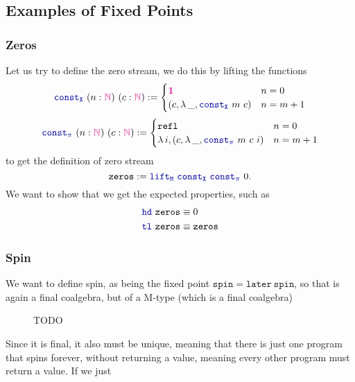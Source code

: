 \documentclass[twoside,11pt,openright]{report}
\newcommand*{\type}[1]{\textcolor{magenta!90!black}{#1}}
\newcommand*{\unit}{\type{\textbf{1}}}
\newcommand*{\function}[1]{\textcolor{blue!60!black}{\ensuremath{\mathtt{#1}}}}
\begin{document}
\subsection{Examples of Fixed Points}
\subsubsection{Zeros}
Let us try to define the zero stream, we do this by lifting the functions
\begin{equation}
  \function{const_X}~(n : \type{\mathbb{N}})~(c : \type{\mathbb{N}})  := \begin{cases} \unit & n = 0 \\ (c , \lambda\,\_, \function{const_X}~m~c) & n = m + 1 \end{cases}
\end{equation}
\begin{equation}
  \function{const_\pi}~(n : \type{\mathbb{N}})~(c : \type{\mathbb{N}}) := \begin{cases} \mathtt{refl} & n = 0 \\ \lambda\,i,(c , \lambda\,\_, \function{const_\pi}~m~c~i) & n = m + 1 \end{cases}
\end{equation}
to get the definition of zero stream
\begin{equation}
  \mathtt{zeros} := \function{lift_M}~\function{const_X}~\function{const_\pi}~0.
\end{equation}
We want to show that we get the expected properties, such as
\begin{align}
  \function{hd}~\mathtt{zeros} &\equiv 0 \\
  \function{tl}~\mathtt{zeros} &\equiv \mathtt{zeros}
\end{align}

\subsubsection{Spin}
We want to define spin, as being the fixed point \(\mathtt{spin} = \mathtt{later}~\mathtt{spin}\), so that is again a final coalgebra, but of a M-type (which is a final coalgebra)

\begin{figure}[h]
  \centering
  \caption{TODO}
\end{figure}
\noindent Since it is final, it also must be unique, meaning that there is just one program that spins forever, without returning a value, meaning every other program must return a value. If we just
\end{document}
